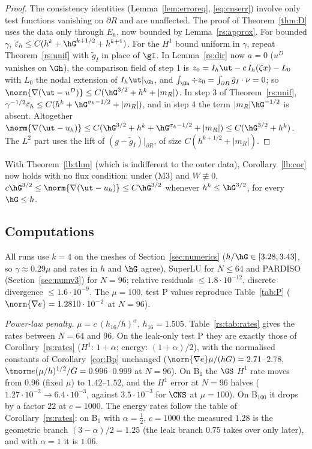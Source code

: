 \begin{proof}
The consistency identities (Lemma~\ref{lem:erroreq}, \eqref{eq:cnserr}) involve only test functions vanishing on $\partial R$ and are unaffected. The proof of Theorem~\ref{thm:D} uses the data only through $E_h$, now bounded by Lemma~\ref{rs:approx}. For bounded $\gamma$, $\tilde\varepsilon_h\le C(h^k+\hG^{k+1/2}+h^{k+1})$. For the $H^1$ bound uniform in $\gamma$, repeat Theorem~\ref{rs:unif} with $\tilde g_I$ in place of $\gI$. In Lemma~\ref{rs:dir} now $a=0$ ($u^D$ vanishes on $\Gh$), the comparison field of step 1 is $z_0=I_h\ut-c\,I_h(\zeta x)-L_0$ with $L_0$ the nodal extension of $I_h\ut|_{\Gh}$, and $\int_{\Oh}\div z_0=\int_{\partial R}\tilde g_I\cdot\nu=0$; so $\norm{\nabla(\ut-u^D)}\le C(\hG^{3/2}+h^k+|m_R|)$. In step 3 of Theorem~\ref{rs:unif}, $\gamma^{-1/2}\tilde\varepsilon_h\le C(h^k+\hG^{\sigma_k-1/2}+|m_R|)$, and in step 4 the term $|m_R|\hG^{-1/2}$ is absent. Altogether $\norm{\nabla(\ut-u_h)}\le C(\hG^{3/2}+h^k+\hG^{\sigma_k-1/2}+|m_R|)\le C(\hG^{3/2}+h^k)$. The $L^2$ part uses the lift of $(g-\tilde g_I)|_{\partial R}$, of size $C(h^{k+1/2}+|m_R|)$.
\end{proof}

With Theorem~\ref{lb:thm} (which is indifferent to the outer data), Corollary~\ref{lb:cor} now holds with no flux condition: under (M3) and $W\not\equiv0$, $c\hG^{3/2}\le\norm{\nabla(\ut-u_h)}\le C\hG^{3/2}$ whenever $h^k\le\hG^{3/2}$, for every $\hG\le h$.

\subsection{Computations}\label{rs:sec:num}
All runs use $k=4$ on the meshes of Section~\ref{sec:numerics} ($h/\hG\in[3.28,3.43]$, so $\gamma\approx0.29\mu$ and rates in $h$ and $\hG$ agree), SuperLU for $N\le64$ and PARDISO (Section~\ref{sec:numv3}) for $N=96$; relative residuals $\le1.8\cdot10^{-12}$, discrete divergence $\le1.6\cdot10^{-9}$. The $\mu=100$, test P values reproduce Table~\ref{tab:P} ($\norm{\nabla e}=1.2810\cdot10^{-2}$ at $N=96$).

\emph{Power-law penalty.} $\mu=c\,(h_{16}/h)^\alpha$, $h_{16}=1.505$. Table~\ref{rs:tab:rates} gives the rates between $N=64$ and $96$. On the leak-only test P they are exactly those of Corollary~\ref{rs:rates} ($H^1$: $1+\alpha$; energy: $(1+\alpha)/2$), with the normalised constants of Corollary~\ref{cor:Bp} unchanged ($\norm{\nabla e}\mu/(hG)=2.71$--$2.78$, $\tnorm e(\mu/h)^{1/2}/G=0.996$--$0.999$ at $N=96$). On B$_1$ the $\GS$ $H^1$ rate moves from $0.96$ (fixed $\mu$) to $1.42$--$1.52$, and the $H^1$ error at $N=96$ halves ($1.27\cdot10^{-2}\to6.4\cdot10^{-3}$, against $3.5\cdot10^{-3}$ for $\CNS$ at $\mu=100$). On B$_{100}$ it drops by a factor $22$ at $c=1000$. The energy rates follow the table of Corollary~\ref{rs:rates}: on B$_1$ with $\alpha=\frac12$, $c=1000$ the measured $1.28$ is the geometric branch $(3-\alpha)/2=1.25$ (the leak branch $0.75$ takes over only later), and with $\alpha=1$ it is $1.06$.

